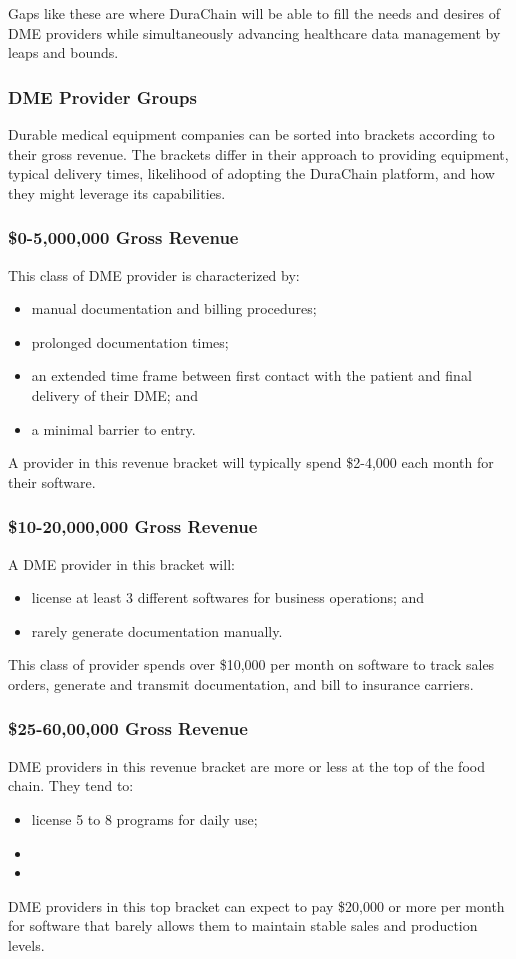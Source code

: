   Gaps like these are where DuraChain will be able to fill the needs and desires of DME providers while simultaneously advancing healthcare data management by leaps and bounds.%

  \subsubsection{DME Provider Groups}
  Durable medical equipment companies can be sorted into brackets according to their gross revenue. The brackets differ in their approach to providing equipment, typical delivery times, likelihood of adopting the DuraChain platform, and how they might leverage its capabilities.%

  \subsubsection{\$0-5,000,000 Gross Revenue}
  This class of DME provider is characterized by:%
  \begin{itemize}
    \item manual documentation and billing procedures;
    \item prolonged documentation times;
    \item an extended time frame between first contact with the patient and final delivery of their DME; and
    \item a minimal barrier to entry.
  \end{itemize}
  A provider in this revenue bracket will typically spend \$2-4,000 each month for their software.%

  \subsubsection{\$10-20,000,000 Gross Revenue}
  A DME provider in this bracket will:%
  \begin{itemize}
    \item license at least 3 different softwares for business operations; and
    \item rarely generate documentation manually.
  \end{itemize}
  This class of provider spends over \$10,000 per month on software to track sales orders, generate and transmit documentation, and bill to insurance carriers.%

  \subsubsection{\$25-60,00,000 Gross Revenue}
  DME providers in this revenue bracket are more or less at the top of the food chain. They tend to:%
  \begin{itemize}
    \item license 5 to 8 programs for daily use;
    \item
    \item
  \end{itemize}
  DME providers in this top bracket can expect to pay \$20,000 or more per month for software that barely allows them to maintain stable sales and production levels.%

